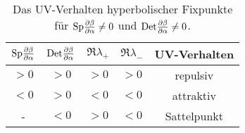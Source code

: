 \begin{table}[h]
	\centering
	\begin{tabular}{ccccc}
	\toprule \midrule
	 $\text{Sp} \frac{\partial \beta}{\partial \alpha} $& $\text{Det} \frac{\partial \beta}{\partial \alpha} $ & $\Re\lambda_+$ &$\Re\lambda_-$ & UV-Verhalten \\
	 \midrule 
	 $>0$	& $>0$	&$>0$ & $>0$	& repulsiv   \\
	 $<0$	& $>0$	&$<0$ & $<0$	& attraktiv  \\
	  -     & $<0$	&$>0$ & $<0$	& Sattelpunkt\\
	  \midrule
	  \bottomrule
	\end{tabular}
	\caption{Das UV-Verhalten hyperbolischer Fixpunkte für $\text{Sp} \frac{\partial \beta}{\partial \alpha}\neq0$ 
	und $\text{Det} \frac{\partial \beta}{\partial \alpha} \neq 0$.}
	\label{beta_im_R2:tab:stabilitaet_hyperbolisch}
\end{table}